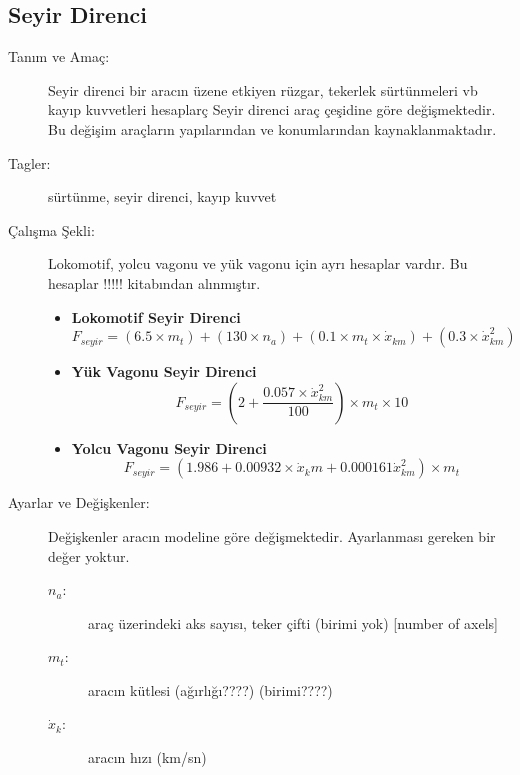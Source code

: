 \documentclass[10pt,a4paper]{article}
\begin{document}
\subsection{Seyir Direnci}
\begin{description}

\item[Tanım ve Amaç:] Seyir direnci bir aracın üzene etkiyen rüzgar, tekerlek sürtünmeleri vb kayıp kuvvetleri hesaplarç Seyir direnci araç çeşidine göre değişmektedir. Bu değişim araçların yapılarından ve konumlarından kaynaklanmaktadır. 

\item[Tagler:] sürtünme, seyir direnci, kayıp kuvvet

\item[Çalışma Şekli:] Lokomotif, yolcu vagonu ve yük vagonu için ayrı hesaplar vardır. Bu hesaplar !!!!! kitabından alınmıştır. 

\begin{itemize}
\item \textbf{Lokomotif Seyir Direnci}
\begin{equation}
F_{seyir} = (6.5 \times m_t) + (130 \times n_a) + (0.1 \times m_t \times \dot{x}_{km}) + (0.3 \times \dot{x}^2_{km})
\end{equation}

\item \textbf{Yük Vagonu Seyir Direnci}
\begin{equation}
F_{seyir} = (2 + \dfrac{0.057 \times \dot{x}^2_{km} }{100})\times m_t \times 10
\end{equation}

\item \textbf{Yolcu Vagonu Seyir Direnci}
\begin{equation}
F_{seyir} = (1.986 + 0.00932 \times \dot{x}_km + 0.000161 \dot{x}^2_{km}) \times m_t
\end{equation}
\end{itemize}

\item[Ayarlar ve Değişkenler:] Değişkenler aracın modeline göre değişmektedir. Ayarlanması gereken bir değer yoktur.
\begin{description}
\item[$n_a$:]araç üzerindeki aks sayısı, teker çifti (birimi yok) [number of axels]
\item[$m_t$:]aracın kütlesi (ağırlığı????) (birimi????)
\item[$\dot{x}_k$:] aracın hızı (km/sn)
\end{description}


\end{description}
\end{document}
